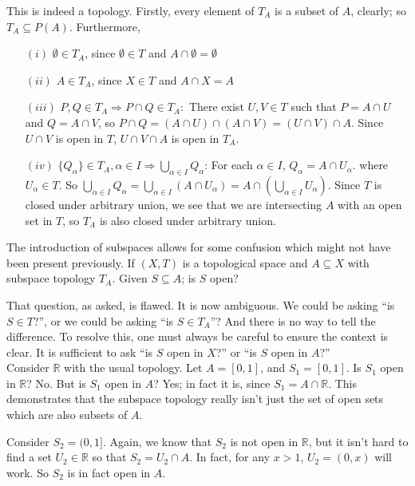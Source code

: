 \documentclass[12pt]{report}
\newcommand{\example}{  \noindent{\sc Example }\hspace{5pt} }
\newcommand{\unionover}[2]{\bigcup_{#1 \in #2 }}
\newcommand{\reals}{\mathbb{R}}
\begin{document}
This is indeed a topology. Firstly, every element of $T_A$ is a subset of $A$,
clearly; so $T_A \subseteq P(A)$. Furthermore,
\begin{enumerate}
\item[$(i)$] $\emptyset \in T_A$, since $\emptyset \in T$ and $A \cap
\emptyset = \emptyset$
\item[$(ii)$] $A \in T_A$, since $X \in T$ and $A \cap X = A$
\item[$(iii)$] $P,Q \in T_A \Rightarrow P \cap Q \in T_A:$
There exist $U,V \in T$ such that $P = A \cap U$ and $Q = A \cap V$, so 
$P \cap Q = (A \cap U) \cap (A \cap V) = (U \cap V) \cap A$.
Since $U \cap V$ is open in $T$, $U \cap V \cap A$ is open in $T_A$.
\item[$(iv)$] $\{Q_\alpha\} \in T_A, \alpha \in I \Rightarrow
\unionover{\alpha}{I}Q_\alpha$: For each $\alpha \in I$, 
$Q_\alpha = A \cap U_\alpha$. where $U_\alpha \in T$. So
$\unionover{\alpha}{I}Q_\alpha = \unionover{\alpha}{I}(A \cap U_\alpha) = A
\cap (\unionover{\alpha}{I}U_\alpha)$. Since $T$ is closed under arbitrary
union, we see that we are intersecting $A$ with an open set in $T$, so $T_A$
is also closed under arbitrary union.
\end{enumerate}

The introduction of subspaces allows for some confusion which might not have
been present previously. If $(X,T)$ is a topological space and $A \subseteq
X$ with subspace topology $T_A$. Given $S \subseteq A$; is $S$ open?  

That question, as asked, is flawed. It is now ambiguous. We could 
be asking ``is $S \in T$?'', or we could be asking ``is $S \in T_A$''? And
there is no way to tell the difference. To resolve this, one must always be
careful to ensure the context is clear. It is sufficient to ask ``is $S$ open
in $X$?'' or ``is $S$ open in $A$?''\\

\example Consider $\reals$ with the usual topology. Let $A = [0,1]$, and 
$S_1 = [0,1]$. Is $S_1$ open in $\reals$? No. But is $S_1$ open in $A$? Yes; in
fact it is, since $S_1 = A \cap \reals$. This demonstrates that the subspace
topology really isn't just the set of open sets which are also subsets of $A$.

Consider $S_2 = (0,1]$. Again, we know that $S_2$ is not open in $\reals$, but
it isn't hard to find a set $U_2 \in \reals$ so that $S_2 = U_2 \cap A$.
In fact, for any $x > 1$, $U_2 = (0,x)$ will work. So $S_2$ is in fact open in
$A$.\\
\end{document}
